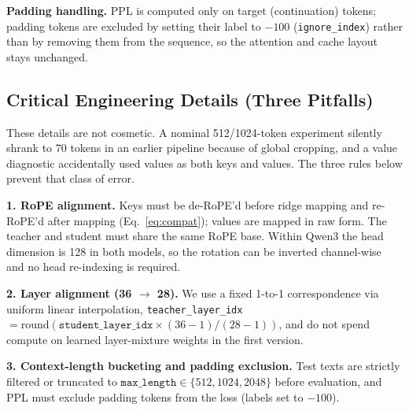 \documentclass[10pt]{article}
\begin{document}
\textbf{Padding handling.} PPL is computed only on target (continuation) tokens; padding tokens
are excluded by setting their label to $-100$ (\texttt{ignore\_index}) rather than by removing
them from the sequence, so the attention and cache layout stays unchanged.

\subsection{Critical Engineering Details (Three Pitfalls)}
These details are not cosmetic. A nominal 512/1024-token experiment silently shrank to 70 tokens
in an earlier pipeline because of global cropping, and a value diagnostic accidentally used values
as both keys and values. The three rules below prevent that class of error.

\textbf{1. RoPE alignment.} Keys must be de-RoPE'd before ridge mapping and re-RoPE'd after
mapping (Eq.~\ref{eq:compat}); values are mapped in raw form. The teacher and student must share
the same RoPE base. Within Qwen3 the head dimension is 128 in both models, so the rotation can be
inverted channel-wise and no head re-indexing is required.

\textbf{2. Layer alignment (36 $\rightarrow$ 28).} We use a fixed 1-to-1 correspondence via uniform
linear interpolation, \texttt{teacher\_layer\_idx} $= \mathrm{round}(\texttt{student\_layer\_idx}
\times (36-1)/(28-1))$, and do not spend compute on learned layer-mixture weights in the first
version.

\textbf{3. Context-length bucketing and padding exclusion.} Test texts are strictly filtered or
truncated to $\texttt{max\_length} \in \{512, 1024, 2048\}$ before evaluation, and PPL must
exclude padding tokens from the loss (labels set to $-100$).
\end{document}
